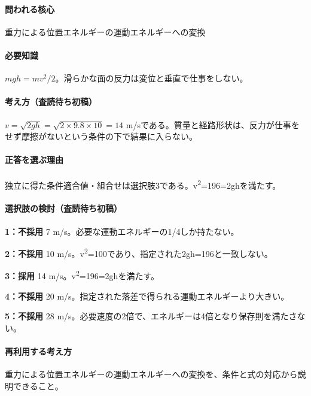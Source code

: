 \paragraph{問われる核心} 重力による位置エネルギーの運動エネルギーへの変換

\paragraph{必要知識} \(mgh=mv^2/2\)。滑らかな面の反力は変位と垂直で仕事をしない。

\paragraph{考え方（査読待ち初稿）} \(v=\sqrt{2gh}=\sqrt{2\times9.8\times10}=14\) m/sである。質量と経路形状は、反力が仕事をせず摩擦がないという条件の下で結果に入らない。

\paragraph{正答を選ぶ理由} 独立に得た条件適合値・組合せは選択肢3である。v\textsuperscript{2}=196=\allowbreak{}2ghを満たす。

\paragraph{選択肢の検討（査読待ち初稿）}\mbox{}\par

\noindent\textbf{1：不採用} 7 m/s。必要な運動エネルギーの1/4しか持たない。\par

\noindent\textbf{2：不採用} 10 m/s。v\textsuperscript{2}=100であり、指定された2gh=\allowbreak{}196と一致しない。\par

\noindent\textbf{3：採用} 14 m/s。v\textsuperscript{2}=196=\allowbreak{}2ghを満たす。\par

\noindent\textbf{4：不採用} 20 m/s。指定された落差で得られる運動エネルギーより大きい。\par

\noindent\textbf{5：不採用} 28 m/s。必要速度の2倍で、エネルギーは4倍となり保存則を満たさない。\par

\paragraph{再利用する考え方} 重力による位置エネルギーの運動エネルギーへの変換を、条件と式の対応から説明できること。

